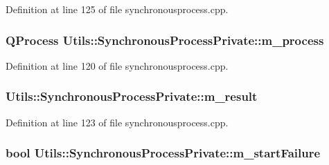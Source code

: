 \-Definition at line 125 of file synchronousprocess.\-cpp.

\hypertarget{struct_utils_1_1_synchronous_process_private_a9d038c134196fac6a5f996a3d290ef3a}{
\subsubsection[{m\-\_\-process}]{\setlength{\rightskip}{0pt plus 5cm}\-Q\-Process {\bf \-Utils\-::\-Synchronous\-Process\-Private\-::m\-\_\-process}}}\label{struct_utils_1_1_synchronous_process_private_a9d038c134196fac6a5f996a3d290ef3a}


\-Definition at line 120 of file synchronousprocess.\-cpp.

\hypertarget{struct_utils_1_1_synchronous_process_private_a608f84c5b1a6612ba627ddbe33fe5a0a}{
\subsubsection[{m\-\_\-result}]{ {\bf \-Utils\-::\-Synchronous\-Process\-Private\-::m\-\_\-result}}}\label{struct_utils_1_1_synchronous_process_private_a608f84c5b1a6612ba627ddbe33fe5a0a}


\-Definition at line 123 of file synchronousprocess.\-cpp.

\hypertarget{struct_utils_1_1_synchronous_process_private_af0eb23e013827b48bea15ed1ba1365c0}{
\subsubsection[{m\-\_\-start\-Failure}]{\setlength{\rightskip}{0pt plus 5cm}bool {\bf \-Utils\-::\-Synchronous\-Process\-Private\-::m\-\_\-start\-Failure}}}\label{struct_utils_1_1_synchronous_process_private_af0eb23e013827b48bea15ed1ba1365c0}


